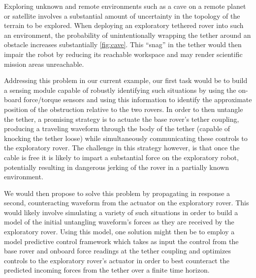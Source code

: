\documentclass[12pt]{article}
\begin{document}
Exploring unknown and remote environments such as a cave on a remote planet or satellite involves a substantial amount of uncertainty in the topology of the terrain to be explored. When deploying an exploratory tethered rover into such an environment, the probability of unintentionally wrapping the tether around an obstacle increases substantially \ref{fig:cave}. This ``snag'' in the tether would then impair the robot by reducing its reachable workspace and may render scientific mission areas unreachable. 

Addressing this problem in our current example, our first task would be to build a sensing module capable of robustly identifying such situations by using the on-board force/torque sensors and using this information to identify the approximate position of the obstruction relative to the two rovers. In order to then untangle the tether, a promising strategy is to actuate the base rover's tether coupling, producing a traveling waveform through the body of the tether (capable of knocking the tether loose) while simultaneously communicating these controls to the exploratory rover. The challenge in this strategy however, is that once the cable is free it is likely to impart a substantial force on the exploratory robot, potentially resulting in dangerous jerking of the rover in a partially known environment. 

We would then propose to solve this problem by propagating in response a second, counteracting waveform from the actuator on the exploratory rover. This would likely involve simulating a variety of such situations in order to build a model of the initial untangling waveform's forces as they are received by the exploratory rover. Using this model, one solution might then be to employ a model predictive control framework which takes as input the control from the base rover and onboard force readings at the tether coupling and optimizes controls to the exploratory rover's actuator in order to best counteract the predicted incoming forces from the tether over a finite time horizon. \\
\end{document}
